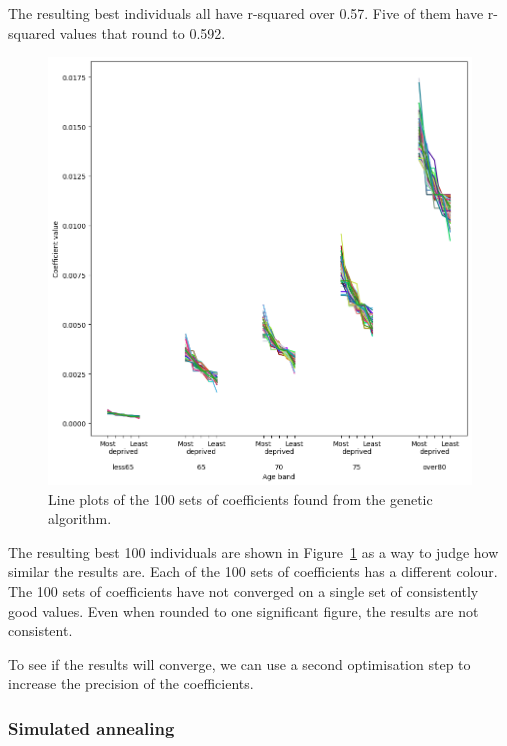 \documentclass[12pt]{extarticle}
\begin{document}
The resulting best individuals all have r-squared over 0.57. Five of them have r-squared values that round to 0.592.


\begin{figure}
    \centering
    \includegraphics[width=1.0\linewidth]{images/scatter_coeffs_from_deap.png}
    \caption{Line plots of the 100 sets of coefficients found from the genetic algorithm.}
    \label{fig:scatter_coeffs_from_deap}
\end{figure}


The resulting best 100 individuals are shown in Figure~\ref{fig:scatter_coeffs_from_deap} as a way to judge how similar the results are. Each of the 100 sets of coefficients has a different colour.
% 
The 100 sets of coefficients have not converged on a single set of consistently good values. Even when rounded to one significant figure, the results are not consistent.

To see if the results will converge, we can use a second optimisation step to increase the precision of the coefficients.


\subsubsection{Simulated annealing}
\end{document}
